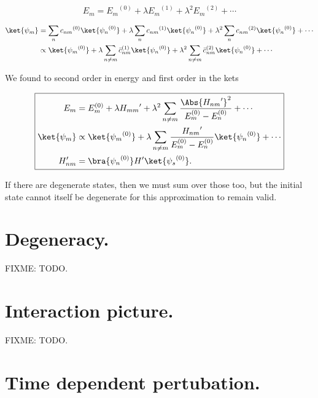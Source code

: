 \begin{equation}\label{eqn:qmTwoReview:n}
E_m = {E_m}^{(0)} + \lambda {E_m}^{(1)} + \lambda^2 {E_m}^{(2)} + \cdots
\end{equation}

\begin{equation}\label{eqn:qmTwoL4:130}
\begin{aligned}
\ket{\psi_m} &= 
\sum_n {c_{nm}}^{(0)} \ket{{\psi_n}^{(0)}} 
+
\lambda
\sum_n {c_{nm}}^{(1)} \ket{{\psi_n}^{(0)}} 
+ 
\lambda^2
\sum_n {c_{nm}}^{(2)} \ket{{\psi_n}^{(0)}} 
+ \cdots \\
&\propto
\ket{{\psi_m}^{(0)}} 
+ 
\lambda
\sum_{n \ne m} {\bar{c}_{nm}}^{(1)} \ket{{\psi_n}^{(0)}} 
+
\lambda^2
\sum_{n \ne m} {\bar{c}_{nm}}^{(2)} \ket{{\psi_n}^{(0)}} 
+ \cdots
\end{aligned}
\end{equation}

We found to second order in energy and first order in the kets

\begin{equation}\label{eqn:qmTwoReview:n}
\boxed{
\begin{aligned}
E_m &= E_m^{(0)} + \lambda {H_{mm}}' + \lambda^2 
\sum_{n \ne m} 
\frac{\Abs{{H_{nm}}'}^2 }
{ E_m^{(0)} - E_n^{(0)} } 
+ \cdots
\\
\ket{\psi_m} &\propto \ket{{\psi_m}^{(0)}} + \lambda
\sum_{n \ne m} 
\frac{{H_{nm}}'}
{ E_m^{(0)} - E_n^{(0)} } \ket{{\psi_n}^{(0)}}
+ \cdots \\
H_{nm}' &=
\bra{{\psi_n}^{(0)}}
H'
\ket{{\psi_s}^{(0)}}.
\end{aligned}
}
\end{equation}

If there are degenerate states, then we must sum over those too, but the initial state cannot itself be degenerate for this approximation to remain valid.

\section{Degeneracy.}

FIXME: TODO.

\section{Interaction picture.}

FIXME: TODO.

\section{Time dependent pertubation.}

